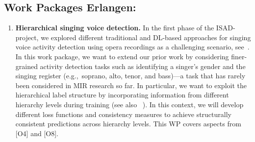 \documentclass[11pt,a4paper]{article}
\def\PN{\mathrm{ISAD}}
\newcommand{\egc}{e.g.,\ }
\theoremstyle{plain} \newtheorem{define}{Definition}[section]
\begin{document}
{\subsection*{\hspace*{0cm} Work Packages Erlangen:}

\renewcommand{\labelenumi}{[WE\arabic{enumi}]}

\begin{enumerate}[itemindent=0.5cm]
\setcounter{enumi}{0}


\item  \label{WE:sing}
\textbf{Hierarchical singing voice detection.} 
%
%
In the first phase of the $\PN$-project, we explored different traditional and DL-based approaches for singing voice activity detection using opera recordings as a challenging scenario, see~\cite{KrauseMW21_OperaSingingActivity_Electronics,MimilakisWAAM19_SingingVDetWagner_MML}. In this work package, we want to extend our prior work by considering finer-grained activity detection tasks such as identifying a singer's gender \cite{WeningerDERS11_VocalistGenderRecognition_ICASSP} and the singing register (\egc soprano, alto, tenor, and bass)---a task that has rarely been considered in MIR research so far. 
%
In particular, we want to exploit the hierarchical label structure by incorporating information from different hierarchy levels during training (see also ~\cite{Zih-SingS19_HierarchicalClassificationSingingTranscription_ISMIR, WehrmannCB18_HierarchicalMultilabelDNN_ICML}). In this context, we will develop different loss functions and consistency measures to achieve structurally consistent predictions across hierarchy levels. 
%
This WP covers aspects from [O4] and [O8].


\end{enumerate}}
\end{document}
